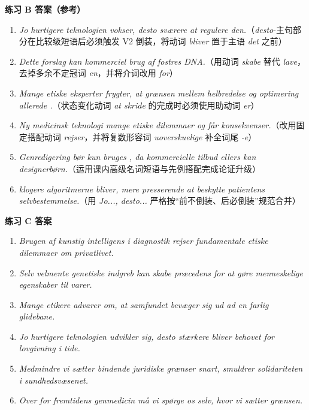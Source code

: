 \begin{answerbox}
\textbf{练习 B 答案（参考）}
\begin{enumerate}
  \item \textit{Jo hurtigere teknologien vokser, desto sværere  at regulere den.}（\textit{desto}-主句部分在比较级短语后必须触发 V2 倒装，将动词 \textit{bliver} 置于主语 \textit{det} 之前）
  \item \textit{Dette forslag kan  kommerciel brug af fostres DNA.}（用动词 \textit{skabe} 替代 \textit{lave}，去掉多余不定冠词 \textit{en}，并将介词改用 \textit{for}）
  \item \textit{Mange etiske eksperter frygter, at grænsen mellem helbredelse og optimering allerede .}（状态变化动词 \textit{at skride} 的完成时必须使用助动词 \textit{er}）
  \item \textit{Ny medicinsk teknologi  mange etiske dilemmaer og får  konsekvenser.}（改用固定搭配动词 \textit{rejser}，并将复数形容词 \textit{uoverskuelige} 补全词尾 \textit{-e}）
  \item \textit{Genredigering bør kun bruges , da kommercielle tilbud ellers kan  designerbørn.}（运用课内高级名词短语与先例搭配完成论证升级）
  \item \textit{ klogere algoritmerne bliver,  mere presserende  at beskytte patientens selvbestemmelse.}（用 \textit{Jo..., desto...} 严格按“前不倒装、后必倒装”规范合并）
\end{enumerate}

\textbf{练习 C 答案}
\begin{enumerate}
  \item \textit{Brugen af kunstig intelligens i diagnostik rejser fundamentale etiske dilemmaer om privatlivet.}
  \item \textit{Selv velmente genetiske indgreb kan skabe præcedens for at gøre menneskelige egenskaber til varer.}
  \item \textit{Mange etikere advarer om, at samfundet bevæger sig ud ad en farlig glidebane.}
  \item \textit{Jo hurtigere teknologien udvikler sig, desto stærkere bliver behovet for lovgivning i tide.}
  \item \textit{Medmindre vi sætter bindende juridiske grænser snart, smuldrer solidariteten i sundhedsvæsenet.}
  \item \textit{Over for fremtidens genmedicin må vi spørge os selv, hvor vi sætter grænsen.}
\end{enumerate}


\end{answerbox}
